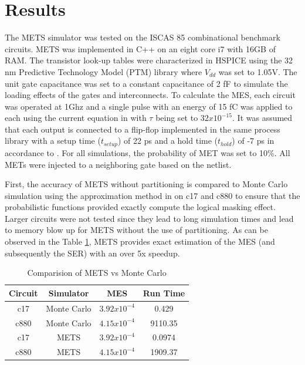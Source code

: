 \documentclass[conference]{IEEEtran}
\begin{document}
\section{Results} \label{results}

The METS simulator was tested on the ISCAS 85 combinational benchmark circuits. METS was implemented in C++ on an eight core i7 with 16GB of RAM. The transistor look-up tables were characterized in HSPICE using the 32 nm Predictive Technology Model (PTM) library \cite{PTM} where $V_{dd}$ was set to 1.05V. The unit gate capacitance was set to a constant capacitance of 2 fF to simulate the loading effects of the gates and interconnects. To calculate the MES, each circuit was operated at 1Ghz and a single pulse with an energy of 15 fC was applied to each using the current equation in \cite{Ziegler1996} with $\tau$ being set to $32x10^{-15}$. It was assumed that each output is connected to a flip-flop implemented in the same process library with a setup time ($t_{setup}$) of 22 ps and a hold time ($t_{hold}$) of -7 ps in accordance to \cite{Nunes2013}. For all simulations, the probability of MET was set to 10\%. All METs were injected to a neighboring gate based on the netlist.

First, the accuracy of METS without partitioning is compared to Monte Carlo simulation using the approximation method in \cite{Watkins2016} on c17 and c880 to ensure that the probabilistic functions provided exactly compute the logical masking effect. Larger circuits were not tested since they lead to long simulation times and lead to memory blow up for METS without the use of partitioning. As can be observed in the Table \ref{table:MCv}, METS provides exact estimation of the MES (and subsequently the SER) with an over 5x speedup. 

\begin{table}[ht]
	\begin{center}
		\caption{Comparision of METS vs Monte Carlo}
		\label{table:MCv}
		\begin{tabular}{|c|c|c|c|}
			\hline
			Circuit& Simulator & MES & Run Time\\ 
			\hline
			c17 & Monte Carlo & $3.92x10^{-4}$ & 0.429\\
			\hline
			c880 & Monte Carlo & $4.15x10^{-4}$ & 9110.35\\
			\hline
			c17 & METS & $3.92x10^{-4}$ & 0.0974\\
			\hline
			c880 & METS & $4.15x10^{-4}$ & 1909.37\\
			\hline
		\end{tabular}
	\end{center}
\end{table}
\end{document}

